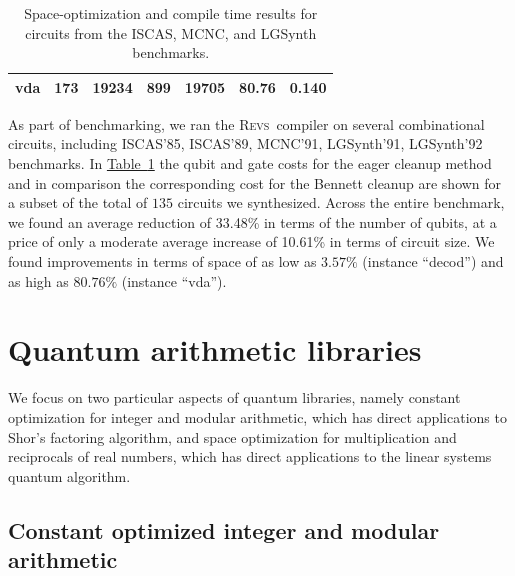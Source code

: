 \documentclass[conference]{IEEEtran}
\newcommand{\tab}[1]{\hyperref[tab:#1]{Table~\ref*{tab:#1}}}
\newcommand{\REVS}{{\textsc{Revs}}}
\begin{document}
\begin{table}[hbt]
\begin{tabular}{crrrrcc}
    vda             &       173     &       19234   &       899     &       19705   & 80.76       & 0.140 \\ %
\hline
  \end{tabular}
\bigskip
\caption{\label{tab:mcnc} Space-optimization and compile time results for circuits from the ISCAS, MCNC, and LGSynth benchmarks.}
\end{table}



As part of benchmarking, we ran the \REVS~compiler on several combinational circuits, including ISCAS'85, ISCAS'89, MCNC'91, LGSynth'91, LGSynth'92 benchmarks. In  \tab{mcnc}  the qubit and gate costs for the eager cleanup method and in comparison the corresponding cost for the Bennett cleanup are shown for a subset of the total of $135$ circuits we synthesized. Across the entire benchmark, we found an average reduction of 33.48\% in terms of the number of qubits, at a price of only a moderate average increase of 10.61\% in terms of circuit size.
We found improvements in terms of space of as low as $3.57\%$ (instance ``decod'') and as high as $80.76\%$ (instance ``vda''). 


\section{Quantum arithmetic libraries} %

We focus on two particular aspects of quantum libraries, namely constant optimization for integer and modular arithmetic, which has direct applications to Shor's factoring algorithm, and space optimization for multiplication and reciprocals of real numbers, which has direct applications to the linear systems quantum algorithm. 

\subsection{Constant optimized integer and modular arithmetic}
\end{document}

